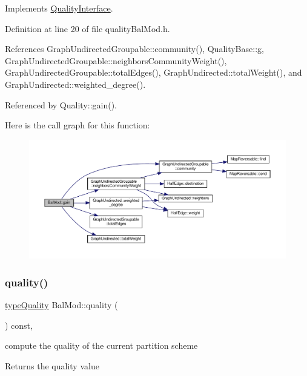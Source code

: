 Implements \hyperlink{classQualityInterface_ab6a2e15d118c3945243abb96c7cc0360}{Quality\+Interface}.



Definition at line 20 of file quality\+Bal\+Mod.\+h.



References Graph\+Undirected\+Groupable\+::community(), Quality\+Base\+::g, Graph\+Undirected\+Groupable\+::neighbors\+Community\+Weight(), Graph\+Undirected\+Groupable\+::total\+Edges(), Graph\+Undirected\+::total\+Weight(), and Graph\+Undirected\+::weighted\+\_\+degree().



Referenced by Quality\+::gain().

Here is the call graph for this function\+:
\nopagebreak
\begin{figure}[H]
\begin{center}
\leavevmode
\includegraphics[width=350pt]{classBalMod_a5e65ffa1b97d2455a552ed98cb003bcc_cgraph}
\end{center}
\end{figure}
\mbox{\label{classBalMod_a5cfc9f2446c0734496440aa7fcfc2a9a}} 
\subsubsection{\texorpdfstring{quality()}{quality()}}
{\footnotesize\ttfamily \hyperlink{qualityInterface_8h_a15a3ec6041e6e02d00d2eff22c20fd94}{type\+Quality} Bal\+Mod\+::quality (\begin{DoxyParamCaption}{ }\end{DoxyParamCaption}) const\hspace{0.3cm}{\ttfamily [inline]}, {\ttfamily [virtual]}}

compute the quality of the current partition scheme \begin{DoxyReturn}{Returns}
the quality value 
\end{DoxyReturn}


